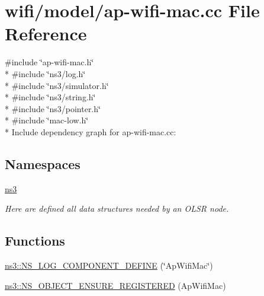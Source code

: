 \hypertarget{ap-wifi-mac_8cc}{}\section{wifi/model/ap-\/wifi-\/mac.cc File Reference}
\label{ap-wifi-mac_8cc}
{\ttfamily \#include \char`\"{}ap-\/wifi-\/mac.\+h\char`\"{}}\\*
{\ttfamily \#include \char`\"{}ns3/log.\+h\char`\"{}}\\*
{\ttfamily \#include \char`\"{}ns3/simulator.\+h\char`\"{}}\\*
{\ttfamily \#include \char`\"{}ns3/string.\+h\char`\"{}}\\*
{\ttfamily \#include \char`\"{}ns3/pointer.\+h\char`\"{}}\\*
{\ttfamily \#include \char`\"{}mac-\/low.\+h\char`\"{}}\\*
Include dependency graph for ap-\/wifi-\/mac.cc\+:
\subsection*{Namespaces}
\begin{DoxyCompactItemize}
\item 
 \hyperlink{namespacens3}{ns3}
\begin{DoxyCompactList}\small\item\em Here are defined all data structures needed by an O\+L\+SR node. \end{DoxyCompactList}\end{DoxyCompactItemize}
\subsection*{Functions}
\begin{DoxyCompactItemize}
\item 
\hyperlink{namespacens3_ad5eaa83da7bd2f9bee0f27ce47d35d79}{ns3\+::\+N\+S\+\_\+\+L\+O\+G\+\_\+\+C\+O\+M\+P\+O\+N\+E\+N\+T\+\_\+\+D\+E\+F\+I\+NE} (\char`\"{}Ap\+Wifi\+Mac\char`\"{})
\item 
\hyperlink{namespacens3_aec802a4d32a247b0f937e0a119cb9c2e}{ns3\+::\+N\+S\+\_\+\+O\+B\+J\+E\+C\+T\+\_\+\+E\+N\+S\+U\+R\+E\+\_\+\+R\+E\+G\+I\+S\+T\+E\+R\+ED} (Ap\+Wifi\+Mac)
\end{DoxyCompactItemize}
